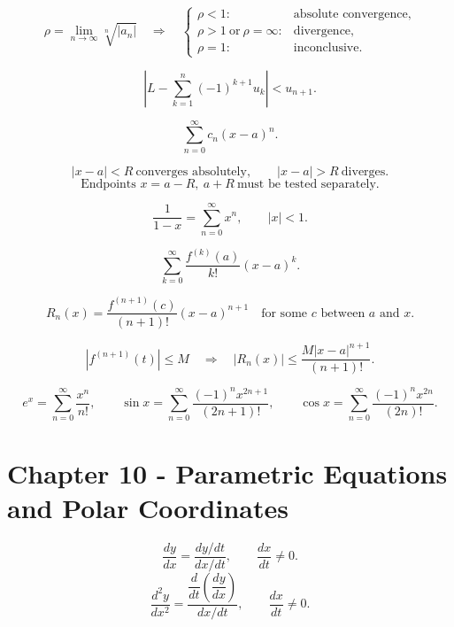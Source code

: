 \[
  \rho=\lim_{n\to\infty}\sqrt[n]{|a_n|}
  \quad\Longrightarrow\quad
  \begin{cases}
    \rho<1: & \text{absolute convergence},\\
    \rho>1\ \text{or}\ \rho=\infty: & \text{divergence},\\
    \rho=1: & \text{inconclusive}.
  \end{cases}
\]

\[
  \left|L-\sum_{k=1}^{n}(-1)^{k+1}u_k\right|<u_{n+1}.
\]

\[
  \sum_{n=0}^{\infty}c_n(x-a)^n.
\]

\[
  |x-a|<R\ \text{converges absolutely},
  \qquad
  |x-a|>R\ \text{diverges}.
\]
\[
  \text{Endpoints }x=a-R,\ a+R\ \text{must be tested separately}.
\]

\[
  \frac{1}{1-x}=\sum_{n=0}^{\infty}x^n,
  \qquad |x|<1.
\]

\[
  \sum_{k=0}^{\infty}\frac{f^{(k)}(a)}{k!}(x-a)^k.
\]

\[
  R_n(x)=\frac{f^{(n+1)}(c)}{(n+1)!}(x-a)^{n+1}
  \quad\text{for some }c\text{ between }a\text{ and }x.
\]

\[
  \left|f^{(n+1)}(t)\right|\le M
  \quad\Longrightarrow\quad
  |R_n(x)|\le\frac{M|x-a|^{n+1}}{(n+1)!}.
\]

\[
  e^x=\sum_{n=0}^{\infty}\frac{x^n}{n!},
  \qquad
  \sin x=\sum_{n=0}^{\infty}\frac{(-1)^nx^{2n+1}}{(2n+1)!},
  \qquad
  \cos x=\sum_{n=0}^{\infty}\frac{(-1)^nx^{2n}}{(2n)!}.
\]

\section*{Chapter 10 - Parametric Equations and Polar Coordinates}

\[
  \frac{dy}{dx}
  =
  \frac{dy/dt}{dx/dt},
  \qquad
  \frac{dx}{dt}\ne0.
\]
\[
  \frac{d^2y}{dx^2}
  =
  \frac{\dfrac{d}{dt}\left(\dfrac{dy}{dx}\right)}{dx/dt},
  \qquad
  \frac{dx}{dt}\ne0.
\]

